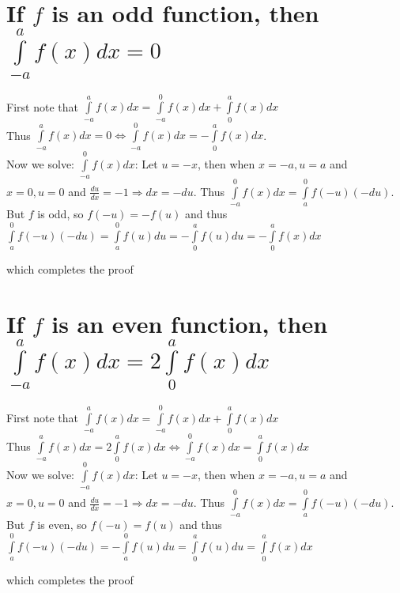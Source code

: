 \documentclass[10pt]{article}
\begin{document}
\section{If $f$ is an odd function, then $\int \limits _{-a}^a f(x)dx = 0$}
First note that $\int \limits _{-a}^a f(x)dx = 
\int \limits _{-a}^0 f(x)dx+\int \limits _{0}^a f(x)dx$\\
Thus $\int \limits _{-a}^a f(x)dx = 0 \iff \int \limits _{-a}^0 f(x)dx =-\int \limits _{0}^a f(x)dx$.\\
Now we solve: $\int \limits _{-a}^0 f(x)dx$: Let $u=-x$, then when $x=-a, u=a$ and $x=0, u=0$ and $\frac{du}{dx}=-1 \Rightarrow dx=-du$. Thus $\int \limits _{-a}^0 f(x)dx=\int \limits _{a}^0 f(-u)(-du)$. But $f$ is odd, so $f(-u)=-f(u)$ and thus $\int \limits _{a}^0 f(-u)(-du) =\int \limits _{a}^0 f(u)du=-\int \limits _{0}^a f(u)du=-\int \limits _{0}^a f(x)dx$

which completes the proof

\section{If $f$ is an even function, then $\int \limits _{-a}^a f(x)dx = 2\int \limits _{0}^a f(x)dx$}
First note that $\int \limits _{-a}^a f(x)dx = 
\int \limits _{-a}^0 f(x)dx+\int \limits _{0}^a f(x)dx$\\
Thus $\int \limits _{-a}^a f(x)dx =2\int \limits _{0}^a f(x)dx \iff \int \limits _{-a}^0 f(x)dx =\int \limits _{0}^a f(x)dx$\\
Now we solve:  $\int \limits _{-a}^0 f(x)dx$: Let $u=-x$, then when $x=-a, u=a$ and $x=0, u=0$ and $\frac{du}{dx}=-1 \Rightarrow dx=-du$. Thus $\int \limits _{-a}^0 f(x)dx=\int \limits _{a}^0 f(-u)(-du)$. But $f$ is even, so $f(-u)=f(u)$ and thus $\int \limits _{a}^0 f(-u)(-du) =-\int \limits _{a}^0 f(u)du=\int \limits _{0}^a f(u)du=\int \limits _{0}^a f(x)dx$

which completes the proof
\end{document}
